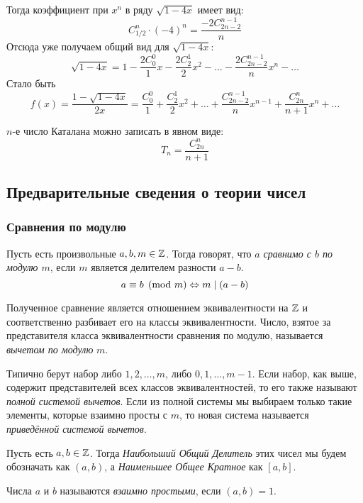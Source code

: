 Тогда коэффициент при $x^n$ в ряду $\sqrt{1 - 4x}$ имеет вид:
\[
	C_{1/2}^n \cdot (-4)^n = \frac{-2C_{2n - 2}^{n - 1}}{n}
\]
Отсюда уже получаем общий вид для $\sqrt{1 - 4x}$:
\[
	\sqrt{1 - 4x} = 1 - \frac{2C_0^0}{1} x - \frac{2C_2^1}{2} x^2 - \ldots - \frac{2C_{2n - 2}^{n - 1}}{n} x^n - \ldots
\]
Стало быть
\[
	f(x) = \frac{1 - \sqrt{1 - 4x}}{2x} = \frac{C_0^0}{1} + \frac{C_2^1}{2} x^2 + \ldots + \frac{C_{2n - 2}^{n - 1}}{n} x^{n - 1} + \frac{C_{2n}^n}{n + 1} x^n + \ldots
\]
\begin{theorem}
	$n$-е число Каталана можно записать в явном виде:
	\[
		T_n = \frac{C_{2n}^n}{n + 1}
	\]
\end{theorem}

\subsection{Предварительные сведения о теории чисел}

\subsubsection*{Сравнения по модулю}

\begin{definition}
	Пусть есть произвольные $a, b, m \in \mathbb{Z}$. Тогда говорят, что \textit{$a$ сравнимо с $b$ по модулю $m$}, если $m$ является делителем разности $a - b$.
	\[
		a \equiv b \pmod m \Leftrightarrow m \mid (a - b)
	\]
\end{definition}

\begin{definition}
	Полученное сравнение является отношением эквивалентности на $\mathbb{Z}$ и соответственно разбивает его на классы эквивалентности. Число, взятое за представителя класса эквивалентности сравнения по модулю, называется \textit{вычетом по модулю} $m$.
	
	Типично берут набор либо $1, 2, \ldots, m$, либо $0, 1, \ldots, m - 1$. Если набор, как выше, содержит представителей всех классов эквивалентностей, то его также называют \textit{полной системой вычетов}. Если из полной системы мы выбираем только такие элементы, которые взаимно просты с $m$, то новая система называется \textit{приведённой системой вычетов}.
\end{definition}

\begin{definition}
	Пусть есть $a, b \in \mathbb{Z}$. Тогда \textit{Наибольший Общий Делитель} этих чисел мы будем обозначать как $(a, b)$, а \textit{Наименьшее Общее Кратное} как $[a, b]$.
	
	Числа $a$ и $b$ называются \textit{взаимно простыми}, если $(a, b) = 1$.
\end{definition}

